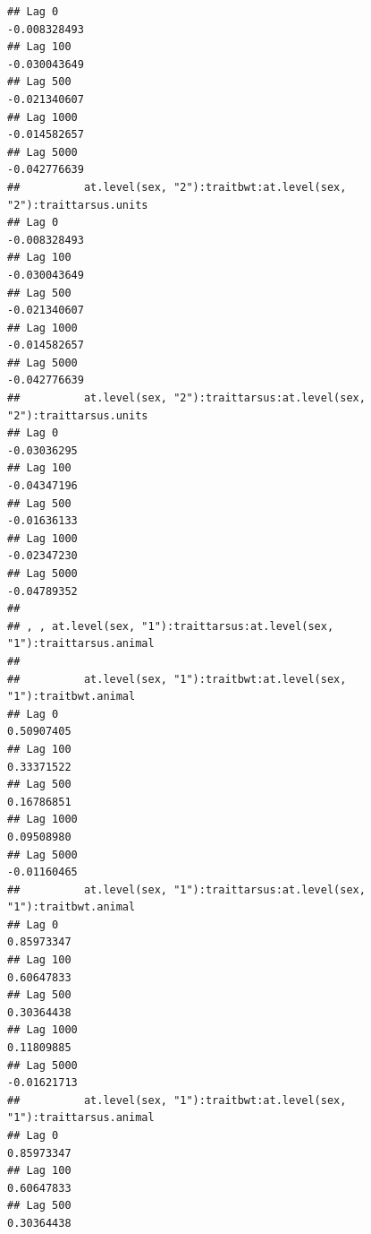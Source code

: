 \documentclass[
  12pt,
]{book}
\begin{document}
\begin{verbatim}
## Lag 0                                                        -0.008328493
## Lag 100                                                      -0.030043649
## Lag 500                                                      -0.021340607
## Lag 1000                                                     -0.014582657
## Lag 5000                                                     -0.042776639
##          at.level(sex, "2"):traitbwt:at.level(sex, "2"):traittarsus.units
## Lag 0                                                        -0.008328493
## Lag 100                                                      -0.030043649
## Lag 500                                                      -0.021340607
## Lag 1000                                                     -0.014582657
## Lag 5000                                                     -0.042776639
##          at.level(sex, "2"):traittarsus:at.level(sex, "2"):traittarsus.units
## Lag 0                                                            -0.03036295
## Lag 100                                                          -0.04347196
## Lag 500                                                          -0.01636133
## Lag 1000                                                         -0.02347230
## Lag 5000                                                         -0.04789352
## 
## , , at.level(sex, "1"):traittarsus:at.level(sex, "1"):traittarsus.animal
## 
##          at.level(sex, "1"):traitbwt:at.level(sex, "1"):traitbwt.animal
## Lag 0                                                        0.50907405
## Lag 100                                                      0.33371522
## Lag 500                                                      0.16786851
## Lag 1000                                                     0.09508980
## Lag 5000                                                    -0.01160465
##          at.level(sex, "1"):traittarsus:at.level(sex, "1"):traitbwt.animal
## Lag 0                                                           0.85973347
## Lag 100                                                         0.60647833
## Lag 500                                                         0.30364438
## Lag 1000                                                        0.11809885
## Lag 5000                                                       -0.01621713
##          at.level(sex, "1"):traitbwt:at.level(sex, "1"):traittarsus.animal
## Lag 0                                                           0.85973347
## Lag 100                                                         0.60647833
## Lag 500                                                         0.30364438

\end{verbatim}
\end{document}
